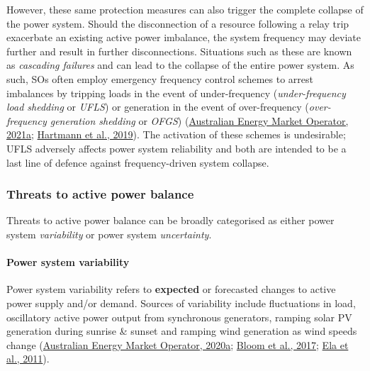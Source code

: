 \documentclass[12pt,a4paper,]{report}
\begin{document}
However, these same protection measures can also trigger the complete
collapse of the power system. Should the disconnection of a resource
following a relay trip exacerbate an existing active power imbalance,
the system frequency may deviate further and result in further
disconnections. Situations such as these are known as \emph{cascading
failures} and can lead to the collapse of the entire power system. As
such, SOs often employ emergency frequency control schemes to arrest
imbalances by tripping loads in the event of under-frequency
(\emph{under-frequency load shedding} or \emph{UFLS}) or generation in
the event of over-frequency (\emph{over-frequency generation shedding}
or \emph{OFGS})
(\protect\hyperlink{ref-australianenergymarketoperatorEnduringPrimaryFrequency2021}{Australian
Energy Market Operator, 2021a};
\protect\hyperlink{ref-hartmannEffectsDecreasingSynchronous2019}{Hartmann
et al., 2019}). The activation of these schemes is undesirable; UFLS
adversely affects power system reliability and both are intended to be a
last line of defence against frequency-driven system collapse.

\hypertarget{sec:lit_review-balancing_threats}{%
\subsubsection{Threats to active power
balance}\label{sec:lit_review-balancing_threats}}

Threats to active power balance can be broadly categorised as either
power system \emph{variability} or power system \emph{uncertainty}.

\hypertarget{power-system-variability}{%
\paragraph{Power system variability}\label{power-system-variability}}

Power system variability refers to \textbf{expected} or forecasted
changes to active power supply and/or demand. Sources of variability
include fluctuations in load, oscillatory active power output from
synchronous generators, ramping solar PV generation during sunrise \&
sunset and ramping wind generation as wind speeds change
(\protect\hyperlink{ref-australianenergymarketoperatorRenewableIntegrationStudy2020}{Australian
Energy Market Operator, 2020a};
\protect\hyperlink{ref-bloomItIndisputableFive2017}{Bloom et al., 2017};
\protect\hyperlink{ref-elaOperatingReservesVariable2011}{Ela et al.,
2011}).
\end{document}
